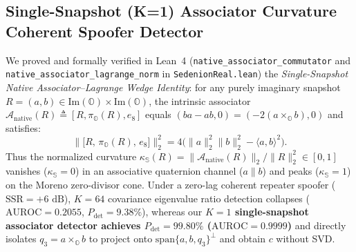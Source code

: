 \documentclass[12pt,letterpaper]{article}
\begin{document}
\subsection{Single-Snapshot (K=1) Associator Curvature Coherent Spoofer Detector}
We proved and formally verified in Lean~4 (\texttt{native\_associator\_commutator} and \texttt{native\_associator\_lagrange\_norm} in \texttt{SedenionReal.lean}) the \textit{Single-Snapshot Native Associator--Lagrange Wedge Identity}: for any purely imaginary snapshot $R = (a, b) \in \mathrm{Im}(\mathbb{O})\times\mathrm{Im}(\mathbb{O})$, the intrinsic associator $\mathcal{A}_{\mathrm{native}}(R) \triangleq [R, \pi_{\mathbb{O}}(R), e_8]$ equals $(ba - ab, 0) = (-2(a\times_{\mathbb{O}} b), 0)$ and satisfies:
\[
    \bigl\|\bigl[R,\, \pi_{\mathbb{O}}(R),\, e_8\bigr]\bigr\|_2^2 = 4\bigl(\|a\|_2^2 \|b\|_2^2 - \langle a, b \rangle^2\bigr).
\]
Thus the normalized curvature $\kappa_{\mathbb{S}}(R) = \|\mathcal{A}_{\mathrm{native}}(R)\|_2 / \|R\|_2^2 \in [0, 1]$ vanishes ($\kappa_{\mathbb{S}}=0$) in an associative quaternion channel ($a \parallel b$) and peaks ($\kappa_{\mathbb{S}}=1$) on the Moreno zero-divisor cone. Under a zero-lag coherent repeater spoofer ($\mathrm{SSR}=+6\text{ dB}$), $K=64$ covariance eigenvalue ratio detection collapses ($\mathrm{AUROC} = 0.2055$, $P_{\mathrm{det}} = 9.38\%$), whereas our \textbf{$K=1$ single-snapshot associator detector achieves $P_{\mathrm{det}} = 99.80\%$ ($\mathrm{AUROC} = 0.9999$)} and directly isolates $q_3 = a\times_{\mathbb{O}} b$ to project onto $\mathrm{span}\{a, b, q_3\}^\perp$ and obtain $c$ without SVD.
\end{document}
